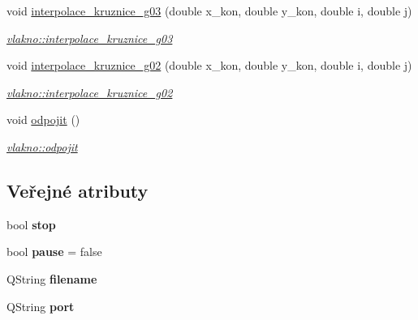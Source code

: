 \begin{DoxyCompactItemize}
void \hyperlink{classvlakno_a96ef9a30c5750cfb900ac3310eaed85f}{interpolace\+\_\+kruznice\+\_\+g03} (double x\+\_\+kon, double y\+\_\+kon, double i, double j)
\begin{DoxyCompactList}\small\item\em \hyperlink{classvlakno_a96ef9a30c5750cfb900ac3310eaed85f}{vlakno\+::interpolace\+\_\+kruznice\+\_\+g03} \end{DoxyCompactList}\item 
void \hyperlink{classvlakno_ae4a4c98596598b8e4db0dad97d6d7939}{interpolace\+\_\+kruznice\+\_\+g02} (double x\+\_\+kon, double y\+\_\+kon, double i, double j)
\begin{DoxyCompactList}\small\item\em \hyperlink{classvlakno_ae4a4c98596598b8e4db0dad97d6d7939}{vlakno\+::interpolace\+\_\+kruznice\+\_\+g02} \end{DoxyCompactList}\item 
void \hyperlink{classvlakno_ab6996cfec8d0ec5fa11da5cb5b87c59d}{odpojit} ()
\begin{DoxyCompactList}\small\item\em \hyperlink{classvlakno_ab6996cfec8d0ec5fa11da5cb5b87c59d}{vlakno\+::odpojit} \end{DoxyCompactList}\end{DoxyCompactItemize}
\subsection*{Veřejné atributy}
\begin{DoxyCompactItemize}
\item 
\hypertarget{classvlakno_aac2ef6a4c234e41b3bc44fe7bb1418c9}{}bool {\bfseries stop}\label{classvlakno_aac2ef6a4c234e41b3bc44fe7bb1418c9}

\item 
\hypertarget{classvlakno_a5eb7dbbb3e3bbaebcbe48785bd013169}{}bool {\bfseries pause} = false\label{classvlakno_a5eb7dbbb3e3bbaebcbe48785bd013169}

\item 
\hypertarget{classvlakno_a0ff23a0f2c8474fb1381458b86a75f4a}{}Q\+String {\bfseries filename}\label{classvlakno_a0ff23a0f2c8474fb1381458b86a75f4a}

\item 
\hypertarget{classvlakno_a4b560e845d53f2194817ae4f63a790ce}{}Q\+String {\bfseries port}\label{classvlakno_a4b560e845d53f2194817ae4f63a790ce}

\end{DoxyCompactItemize}


